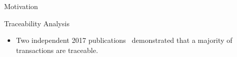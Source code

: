 \begin{columns}[t]
\begin{column}{.47\textwidth}
\begin{block}{Motivation}
\end{block}
\begin{block}{Traceability Analysis}
\begin{itemize}
    \item Two independent 2017 publications~\cite{kumar_traceability_2017,moser_empirical_2018} demonstrated that a majority of transactions are traceable.

\end{itemize}
\end{block}
\end{column}
\end{columns}
